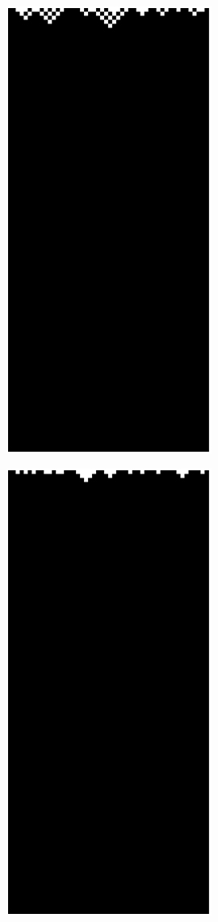  \begin{figure}
 \caption{Class 1 (a,b) and 2 (c,d) elementary cellular automata}
 \label{class12}
\centering
    \begin{subfigure}[b]{0.275\textwidth}
		\centering
		\label{fig:first}
		
		\includegraphics[scale=0.32]{./images/CA_FDM/rule250}
\caption[]{}%
   \end{subfigure}%
    \begin{subfigure}[b]{0.275\textwidth}
		\centering
		\includegraphics[scale=0.32]{./images/CA_FDM/rule254}

\end{subfigure}
\end{figure}
